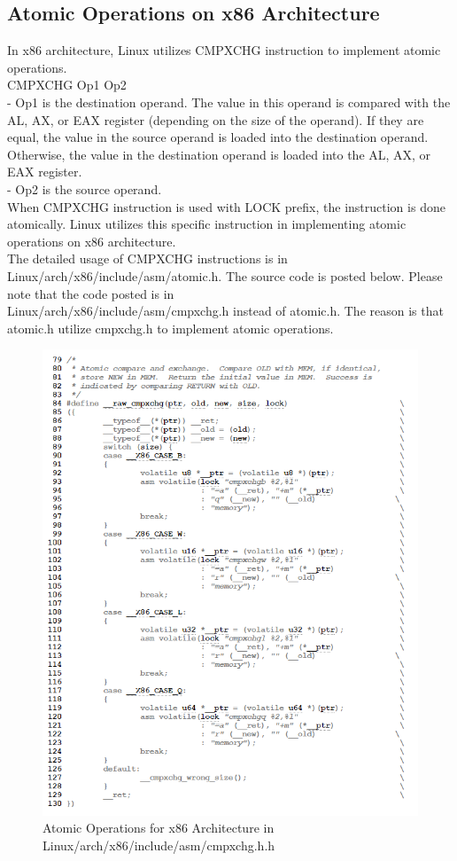 \documentclass[10pt]{sigplanconf}
\begin{document}
\subsection{Atomic Operations on x86 Architecture}
In x86 architecture, Linux utilizes CMPXCHG instruction to implement atomic operations.\\ 
CMPXCHG Op1 Op2\\
- Op1 is the destination operand. The value in this operand is compared with the AL, AX, or EAX register (depending on the size of the operand). If they are equal, the value in the source operand is loaded into the destination operand. Otherwise, the value in the destination operand is loaded into the AL, AX, or EAX register.\\
- Op2 is the source operand.\\
When CMPXCHG instruction is used with LOCK prefix, the instruction is done atomically. Linux utilizes this specific instruction in implementing atomic operations on x86 architecture.\\
The detailed usage of CMPXCHG instructions is in Linux/arch/x86/include/asm/atomic.h. The source code is posted below. Please note that the code posted is in \\Linux/arch/x86/include/asm/cmpxchg.h instead of atomic.h. The reason is that atomic.h utilize cmpxchg.h to implement atomic operations.\\

\begin{figure}[h!]
  \centering
  \includegraphics[scale=0.5]{x86_atomic.png}
  \caption{Atomic Operations for x86 Architecture in Linux/arch/x86/include/asm/cmpxchg.h.h}
  \label{fig:ec}
\end{figure}
\end{document}
